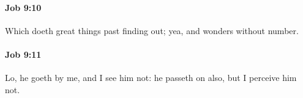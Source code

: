 		\paragraph{Job 9:10} %
			\label{JOB-9-10}

			Which doeth great things past finding out; yea, and wonders without number.


		\paragraph{Job 9:11} %
			\label{JOB-9-11}

			Lo, he goeth by me, and I see him not: he passeth on also, but I perceive him not.


